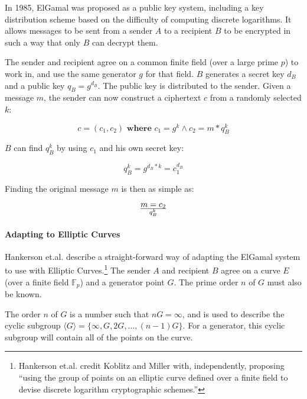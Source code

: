 \label{sec:math_encryption_elgamal}

In 1985, ElGamal was proposed as a public key system, including a key distribution scheme based
on the difficulty of computing discrete logarithms. It allows messages to be sent from a sender
\(A\) to a recipient \(B\) to be encrypted in such a way that only \(B\) can decrypt them.

The sender and recipient agree on a common finite field (over a large prime \(p\)) to work in,
and use the same generator \(g\) for that field. \(B\) generates a secret key \(d_B\) and a public
key \(q_B = g^{d_B}\). The public key is distributed to the sender. Given a message \(m\), the
sender can now construct a ciphertext \(c\) from a randomly selected \(k\):\cite{elgamal}

\begin{equation}
	c = (c_1, c_2)  \textbf{ where }  c_1 = g^k \land c_2 = m * q_B^k
\end{equation}

\(B\) can find \(q_B^k\) by using \(c_1\) and his own secret key:

\begin{equation}
	q_B^k = g^{d_B*k} = c_1^{d_B}
\end{equation}

Finding the original message \(m\) is then as simple as:

\begin{equation}
    m = c_2 \over q_B^k
\end{equation}

\paragraph{Adapting to Elliptic Curves}
Hankerson et.al. describe a straight-forward way of adapting the ElGamal system to use with
Elliptic Curves.\footnote{Hankerson et.al. credit Koblitz and Miller with, independently, proposing
``using the group of points on an elliptic curve defined over a finite field to devise discrete
logarithm cryptographic schemes.''\cite{hankerson2010}} The sender \(A\) and recipient \(B\) agree on a curve \(E\)
(over a finite field \(\mathbb{F}_p\)) and a generator point \(G\). The prime order \(n\) of \(G\) must also be
known.

The order \(n\) of \(G\) is a number such that \(nG = \infty\), and is used to describe the cyclic subgroup
\(\langle G \rangle = \{ \infty, G, 2G, ..., (n-1)G \} \). For a generator, this cyclic subgroup will contain
all of the points on the curve.


